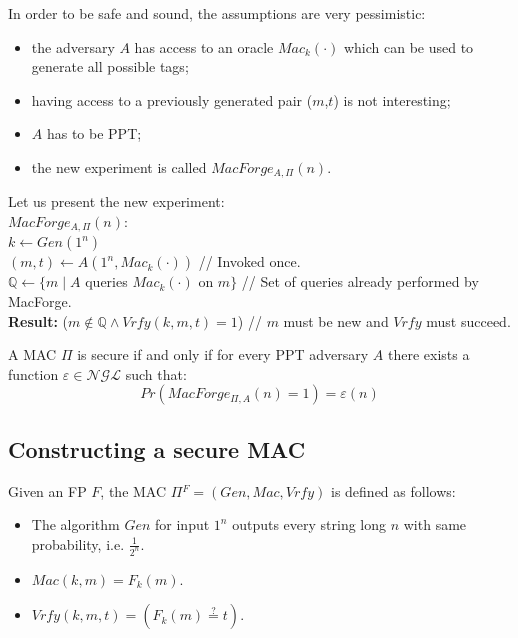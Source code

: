 \documentclass[../main]{subfiles}
\begin{document}
\noindent
In order to be safe and sound, the assumptions are very pessimistic:
\begin{itemize}
    \item the adversary $A$ has access to an oracle $Mac_k(\cdot)$ which can be used to generate all possible tags;
    \item having access to a previously generated pair ($m$,$t$) is not interesting;
    \item $A$ has to be PPT;
    \item the new experiment is called $MacForge_{A,\Pi}(n)$.
\end{itemize}

\noindent
Let us present the new experiment:\\
$MacForge_{A,\Pi}(n):$\\
$k \leftarrow{} Gen(1^n)$\\
$(m,t) \leftarrow{} A(1^n,Mac_k(\cdot))$ // Invoked once.\\
$\mathbb{Q} \leftarrow{} \{m \; | \; A$ queries $Mac_k(\cdot)$ on $m\}$ // Set of queries already performed by MacForge.\\
\textbf{Result:} ($m \notin{\mathbb{Q}} \wedge{} Vrfy(k,m,t) = 1$) // $m$ must be new and $Vrfy$ must succeed.

\begin{definition}
    A MAC $\Pi$ is secure if and only if for every PPT adversary $A$ there exists a function $\varepsilon{} \in{} \mathcal{NGL}$ such that:
    $$Pr(MacForge_{\Pi,A}(n) = 1) = \varepsilon(n)$$
\end{definition}
\subsection{Constructing a secure MAC}
\begin{definition}
    Given an FP $F$, the MAC $\Pi{}^F = (Gen, Mac, Vrfy)$ is defined as follows:
    \begin{itemize}
        \item The algorithm $Gen$ for input $1^n$ outputs every string long $n$ with same probability, i.e. $\frac{1}{2^n}$.
        \item $Mac(k,m) = F_k(m)$.
        \item $Vrfy(k,m,t) = (F_k(m)\stackrel{?}{=}t)$.
    \end{itemize}
\end{definition}
\end{document}

